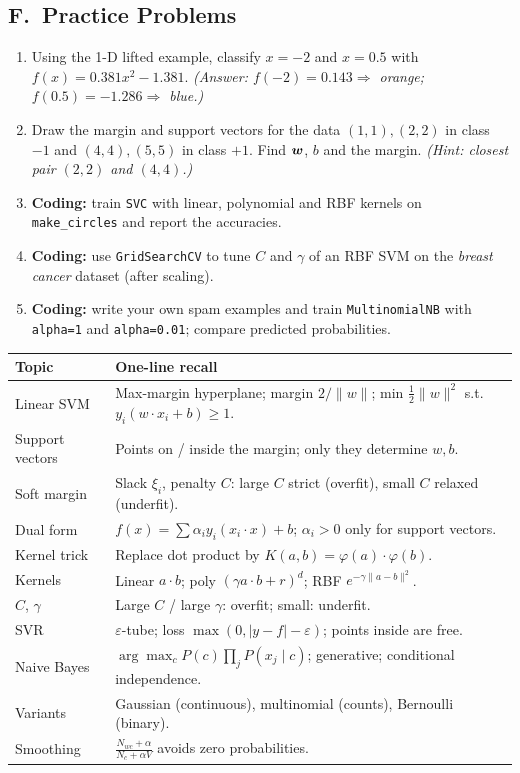 \subsection*{F.\ Practice Problems}
\begin{enumerate}
  \item Using the 1-D lifted example, classify $x=-2$ and $x=0.5$ with $f(x)=0.381x^2-1.381$. \textit{(Answer: $f(-2)=0.143\Rightarrow$ orange; $f(0.5)=-1.286\Rightarrow$ blue.)}
  \item Draw the margin and support vectors for the data $(1,1),(2,2)$ in class $-1$ and $(4,4),(5,5)$ in class $+1$. Find $\boldsymbol{w}$, $b$ and the margin. \textit{(Hint: closest pair $(2,2)$ and $(4,4)$.)}
  \item \textbf{Coding:} train \texttt{SVC} with linear, polynomial and RBF kernels on \texttt{make\_circles} and report the accuracies.
  \item \textbf{Coding:} use \texttt{GridSearchCV} to tune $C$ and $\gamma$ of an RBF SVM on the \emph{breast cancer} dataset (after scaling).
  \item \textbf{Coding:} write your own spam examples and train \texttt{MultinomialNB} with \texttt{alpha=1} and \texttt{alpha=0.01}; compare predicted probabilities.
\end{enumerate}

\begin{revision}
\begin{center}\small
\begin{tabular}{@{}p{3.6cm}p{9.6cm}@{}}
\toprule
\textbf{Topic} & \textbf{One-line recall}\\
\midrule
Linear SVM & Max-margin hyperplane; margin $2/\|w\|$; min $\frac12\|w\|^2$ s.t.\ $y_i(w\cdot x_i+b)\ge1$.\\
Support vectors & Points on / inside the margin; only they determine $w,b$.\\
Soft margin & Slack $\xi_i$, penalty $C$: large $C$ strict (overfit), small $C$ relaxed (underfit).\\
Dual form & $f(x)=\sum\alpha_iy_i(x_i\cdot x)+b$; $\alpha_i>0$ only for support vectors.\\
Kernel trick & Replace dot product by $K(a,b)=\varphi(a)\cdot\varphi(b)$.\\
Kernels & Linear $a\cdot b$; poly $(\gamma a\cdot b+r)^d$; RBF $e^{-\gamma\|a-b\|^2}$.\\
$C$, $\gamma$ & Large $C$ / large $\gamma$: overfit; small: underfit.\\
SVR & $\varepsilon$-tube; loss $\max(0,|y-f|-\varepsilon)$; points inside are free.\\
Naive Bayes & $\arg\max_cP(c)\prod_jP(x_j\mid c)$; generative; conditional independence.\\
Variants & Gaussian (continuous), multinomial (counts), Bernoulli (binary).\\
Smoothing & $\frac{N_{wc}+\alpha}{N_c+\alpha V}$ avoids zero probabilities.\\
\bottomrule
\end{tabular}
\end{center}
\end{revision}
